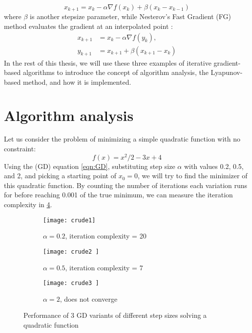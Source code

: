 \begin{equation}\label{eqn:HB}
  x_{k+1}=x_k-\alpha \nabla f(x_k)+ \beta (x_k-x_{k-1})
\end{equation}
where $\beta$ is another stepsize parameter, while Nesterov’s Fast Gradient (FG) method evaluates the gradient at an interpolated point \cite{FG}:
\begin{subequations} \label{eqn:FG}
  \begin{align}
    x_{k+1}     &=x_k-\alpha \nabla f(y_k), \label{eq_state}       \\
    y_{k+1} &=x_{k+1}+\beta (x_{k+1}-x_k) \label{eq_interpolated point}
  \end{align}
  \end{subequations}
In the rest of this thesis, we will use these three examples of iterative gradient-based algorithms to introduce the concept of algorithm analysis, the Lyapunov-based method, and how it is implemented.
\section{Algorithm analysis}
Let us consider the problem of minimizing a simple quadratic function with no constraint:
\begin{equation} \label{eqn:quadratic}
    f(x) = x^2/2 - 3x + 4
\end{equation}
Using the (GD) equation \eqref{eqn:GD}, substituting step size $\alpha$ with values 0.2, 0.5, and 2, and picking a starting point of $x_0 = 0$, we will try to find the minimizer of this quadratic function. By counting the number of iterations each variation runs for before reaching 0.001 of the true minimum, we can measure the iteration complexity in \cref{fig:test}.

\begin{figure}[h!]
  \centering
  \begin{subfigure}{.5\textwidth}
    \centering
    \texttt{[image: crude1]}
    \caption{$\alpha = 0.2$, iteration complexity = 20}
    \label{fig:crude1}
  \end{subfigure}%
  \begin{subfigure}{.5\textwidth}
    \centering
    \texttt{[image: crude2 ]}
    \caption{$\alpha = 0.5$, iteration complexity = 7}
    \label{fig:crude2}
  \end{subfigure}
  \begin{subfigure}{.5\textwidth}
    \centering
    \texttt{[image: crude3 ]}
    \caption{$\alpha = 2$, does not converge}
    \label{fig:crude3}
  \end{subfigure}
  \caption{Performance of 3 GD variants of different step sizes solving a quadratic function}
\label{fig:test}
\end{figure}

